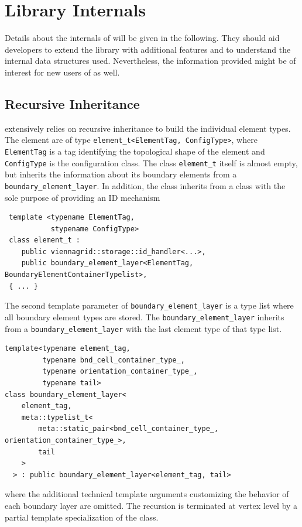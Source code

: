 \chapter{Library Internals} \label{chap:internals}

Details about the internals of {\ViennaGrid} will be given in the following. 
They should aid developers to extend the library with additional features
and to understand the internal data structures used. 
Nevertheless, the information provided might be of interest for new users of {\ViennaGrid} as well.

\section{Recursive Inheritance}
{\ViennaGrid} extensively relies on recursive inheritance to build the individual element types.
The element are of type \lstinline|element_t<ElementTag, ConfigType>|, where \lstinline|ElementTag| is a tag identifying the topological shape of the element and \lstinline|ConfigType| is the configuration class. The class \lstinline|element_t| itself is almost empty, but
inherits the information about its boundary elements from a \lstinline|boundary_element_layer|. 
In addition, the class inherits from a class with the sole purpose of providing an ID mechanism
\begin{lstlisting}
 template <typename ElementTag,
           stypename ConfigType>
 class element_t :
    public viennagrid::storage::id_handler<...>,
    public boundary_element_layer<ElementTag, BoundaryElementContainerTypelist>,
 { ... }
\end{lstlisting}
The second template parameter of \lstinline|boundary_element_layer| is a type list where all boundary element types are stored. The \lstinline|boundary_element_layer| inherits from a \lstinline|boundary_element_layer| with the last element type of that type list.
\begin{lstlisting}
template<typename element_tag,
         typename bnd_cell_container_type_,
         typename orientation_container_type_,
         typename tail>
class boundary_element_layer<
    element_tag,
    meta::typelist_t<
        meta::static_pair<bnd_cell_container_type_, orientation_container_type_>,
        tail
    >
  > : public boundary_element_layer<element_tag, tail>
\end{lstlisting}
where the additional technical template arguments customizing the behavior of each boundary layer are omitted.
The recursion is terminated at vertex level by a partial template specialization of the class.

